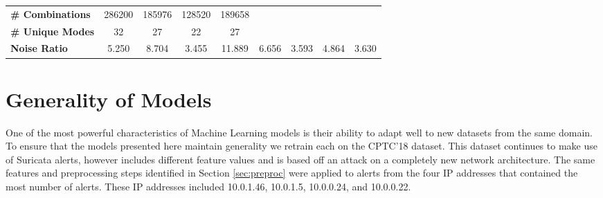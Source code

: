 \begin{table}[!htbp]
\begin{adjustbox}{angle=90}
\begin{tabular}{c|c|c|c|c|c|c|c|c}
			\multicolumn{1}{l|}{\textbf{\# Combinations}} & \multicolumn{1}{c|}{286200} & \multicolumn{1}{c|}{185976} & \multicolumn{1}{c|}{128520} & \multicolumn{1}{c|}{189658} & \multicolumn{1}{l|}{} & \multicolumn{1}{l|}{} & \multicolumn{1}{l|}{} & \multicolumn{1}{l}{} \\
			\multicolumn{1}{l|}{\textbf{\# Unique Modes}} & \multicolumn{1}{c|}{32} & \multicolumn{1}{c|}{27} & \multicolumn{1}{c|}{22} & \multicolumn{1}{c|}{27} & \multicolumn{1}{l|}{} & \multicolumn{1}{l|}{} & \multicolumn{1}{l|}{} & \multicolumn{1}{l}{} \\
			\multicolumn{1}{l|}{\textbf{Noise Ratio}} & 5.250 & 8.704 & 3.455 & 11.889 & 6.656 & 3.593 & 4.864 & 3.630
		\end{tabular}
	\end{adjustbox}
\end{table}

\section{Generality of Models}
\label{sec:cptc18}

One of the most powerful characteristics of Machine Learning models is their ability to adapt well to new datasets from the same domain. To ensure that the models presented here maintain generality we retrain each on the CPTC'18 dataset. This dataset continues to make use of Suricata alerts, however includes different feature values and is based off an attack on a completely new network architecture. The same features and preprocessing steps identified in Section \ref{sec:preproc} were applied to alerts from the four IP addresses that contained the most number of alerts. These IP addresses included 10.0.1.46, 10.0.1.5, 10.0.0.24, and 10.0.0.22. 

